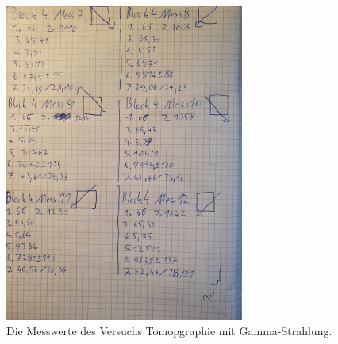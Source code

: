 \begin{figure}[h]
    \centering
    \includegraphics[width=0.7\textwidth]{latex/images/Mess6.jpeg}
    \caption{Die Messwerte des Versuchs Tomopgraphie mit Gamma-Strahlung.}
\end{figure}


